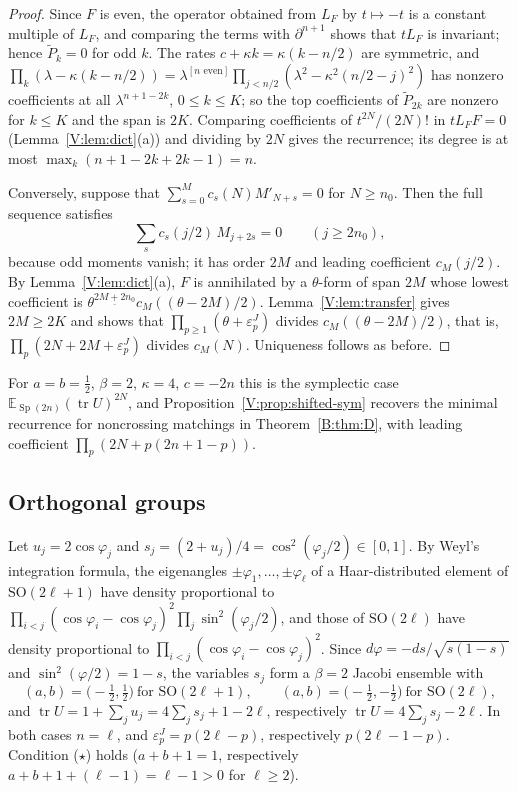 \documentclass[11pt,a4paper]{article}
\theoremstyle{definition}
\theoremstyle{remark}
\newcommand{\E}{\mathbb E}
\newcommand{\ff}[2]{#1^{\underline{#2}}}
\DeclareMathOperator{\tr}{tr}
\DeclareMathOperator{\Sp}{Sp}
\numberwithin{equation}{section}
\begin{document}
\begin{proof}
Since $F$ is even, the operator obtained from $L_F$ by $t\mapsto-t$ is a constant multiple of $L_F$, and comparing the terms with $\partial^{n+1}$ shows that $tL_F$ is invariant; hence $\tilde P_k=0$ for odd $k$. The rates $c+\kappa k=\kappa(k-n/2)$ are symmetric, and $\prod_k(\lambda-\kappa(k-n/2))=\lambda^{[n\text{ even}]}\prod_{j<n/2}(\lambda^2-\kappa^2(n/2-j)^2)$ has nonzero coefficients at all $\lambda^{n+1-2k}$, $0\le k\le K$; so the top coefficients of $\tilde P_{2k}$ are nonzero for $k\le K$ and the span is $2K$. Comparing coefficients of $t^{2N}/(2N)!$ in $tL_FF=0$ (Lemma~\ref{V:lem:dict}(a)) and dividing by $2N$ gives the recurrence; its degree is at most $\max_k(n+1-2k+2k-1)=n$.

Conversely, suppose that $\sum_{s=0}^{M}c_s(N)M'_{N+s}=0$ for $N\ge n_0$. Then the full sequence satisfies
\[
\sum_sc_s(j/2)\,M_{j+2s}=0\qquad(j\ge2n_0),
\] because odd moments vanish; it has order $2M$ and leading coefficient $c_M(j/2)$. By Lemma~\ref{V:lem:dict}(a), $F$ is annihilated by a $\theta$-form of span $2M$ whose lowest coefficient is $\ff\theta{2M+2n_0}c_M((\theta-2M)/2)$. Lemma~\ref{V:lem:transfer} gives $2M\ge2K$ and shows that $\prod_{p\ge1}(\theta+\varepsilon^J_p)$ divides $c_M((\theta-2M)/2)$, that is, $\prod_p(2N+2M+\varepsilon^J_p)$ divides $c_M(N)$. Uniqueness follows as before.
\end{proof}

For $a=b=\tfrac12$, $\beta=2$, $\kappa=4$, $c=-2n$ this is the symplectic case $\E_{\Sp(2n)}(\tr U)^{2N}$, and Proposition~\ref{V:prop:shifted-sym} recovers the minimal recurrence for noncrossing matchings in Theorem~\ref{B:thm:D}, with leading coefficient $\prod_p(2N+p(2n+1-p))$.

\subsection{Orthogonal groups}
Let $u_j=2\cos\varphi_j$ and $s_j=(2+u_j)/4=\cos^2(\varphi_j/2)\in[0,1]$. By Weyl's integration formula, the eigenangles $\pm\varphi_1,\dots,\pm\varphi_\ell$ of a Haar-distributed element of $\mathrm{SO}(2\ell+1)$ have density proportional to $\prod_{i<j}(\cos\varphi_i-\cos\varphi_j)^2\prod_j\sin^2(\varphi_j/2)$, and those of $\mathrm{SO}(2\ell)$ have density proportional to $\prod_{i<j}(\cos\varphi_i-\cos\varphi_j)^2$. Since $d\varphi=-ds/\sqrt{s(1-s)}$ and $\sin^2(\varphi/2)=1-s$, the variables $s_j$ form a $\beta=2$ Jacobi ensemble with
\[
(a,b)=\bigl(-\tfrac12,\tfrac12\bigr)\ \text{for }\mathrm{SO}(2\ell+1),\qquad(a,b)=\bigl(-\tfrac12,-\tfrac12\bigr)\ \text{for }\mathrm{SO}(2\ell),
\]
and $\tr U=1+\sum_ju_j=4\sum_js_j+1-2\ell$, respectively $\tr U=4\sum_js_j-2\ell$. In both cases $n=\ell$, and $\varepsilon^J_p=p(2\ell-p)$, respectively $p(2\ell-1-p)$. Condition \textup{($\star$)} holds ($a+b+1=1$, respectively $a+b+1+(\ell-1)=\ell-1>0$ for $\ell\ge2$).
\end{document}
